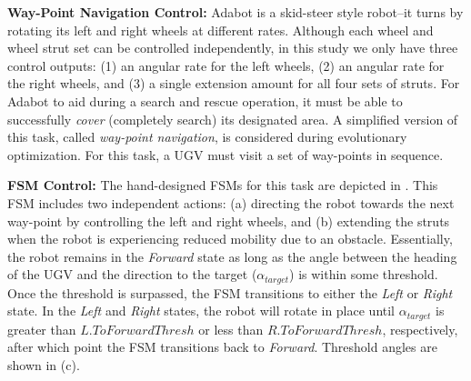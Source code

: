 \noindent
\textbf{Way-Point Navigation Control:}
%
Adabot is a skid-steer style robot--it turns by rotating its left and right wheels at different rates. Although each wheel and wheel strut set can be controlled independently, in this study we only have three control outputs: (1) an angular rate for the left wheels, (2) an angular rate for the right wheels, and (3) a single extension amount for all four sets of struts.
%
For Adabot to aid during a search and rescue operation, it must be able to successfully \emph{cover} (completely search) its designated area.
%
A simplified version of this task, called \emph{way-point navigation}, is considered during evolutionary optimization.
%
For this task, a UGV must visit a set of way-points in sequence.
%


\noindent
\textbf{FSM Control:}
The hand-designed FSMs for this task are depicted in .
%
This FSM includes two independent actions: (a) directing the robot towards the next way-point by controlling the left and right wheels, and (b) extending the struts when the robot is experiencing reduced mobility due to an obstacle.
%
Essentially, the robot remains in the \emph{Forward} state as long as the angle between the heading of the UGV and the direction to the target ($\alpha_{\mathit{target}}$) is within some threshold.
%
Once the threshold is surpassed, the FSM transitions to either the \emph{Left} or \emph{Right} state.
%
In the \emph{Left} and \emph{Right} states, the robot will rotate in place until $\alpha_{\mathit{target}}$ is greater than $L.ToForwardThresh$ or less than $R.ToForwardThresh$, respectively, after which point the FSM transitions back to \emph{Forward}.
%
Threshold angles are shown in (c).

